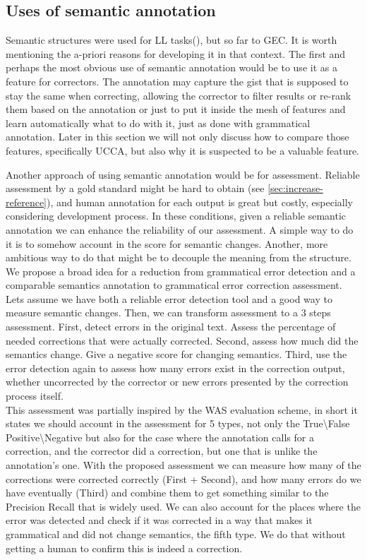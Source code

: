 \documentclass[english]{article}
\begin{document}
\subsection{Uses of semantic annotation}

Semantic structures were used for LL tasks(\cite{king2013shallow}), but so far to GEC. It is worth mentioning the a-priori reasons for developing
it in that context. The first and perhaps the most obvious use of semantic annotation
would be to use it as a feature for correctors. The annotation may
capture the gist that is supposed to stay the same when correcting,
allowing the corrector to filter results or re-rank them based on
the annotation or just to put it inside the mesh of features and learn
automatically what to do with it, just as done with grammatical annotation.
Later in this section we will not only discuss how to compare those
features, specifically UCCA, but also why it is suspected to be a
valuable feature.

Another approach of using semantic annotation would be for assessment.
Reliable assessment by a gold standard might be hard to obtain (see
\ref{sec:increase-reference}), and human annotation for each output is great\cite{madnani2011they}
but costly, especially considering development process. In these conditions,
given a reliable semantic annotation we can enhance the reliability
of our assessment. A simple way to do it is to somehow account in the score for semantic changes. Another, more ambitious way to do that might be to decouple the meaning
from the structure. We propose a broad idea for a reduction from grammatical
error detection and a comparable semantics annotation to grammatical
error correction assessment. Lets assume we have both a reliable error
detection tool and a good way to measure semantic changes. Then, we
can transform assessment to a 3 steps assessment. First, detect errors
in the original text. Assess the percentage of needed corrections
that were actually corrected. Second, assess how much did the semantics change.
 Give a negative score for changing semantics. Third, use
the error detection again to assess how many errors exist in the correction
output, whether uncorrected by the corrector or new errors presented
by the correction process itself. \\

This assessment was partially inspired by the WAS evaluation scheme\cite{chodorow2012problems},
in short it states we should account in the assessment for 5 types,
not only the True\textbackslash{}False Positive\textbackslash{}Negative
but also for the case where the annotation calls for a correction,
and the corrector did a correction, but one that is unlike the annotation's
one. With the proposed assessment we can measure how many of the corrections
were corrected correctly (First + Second), and how many errors do
we have eventually (Third) and combine them to get something similar
to the Precision Recall that is widely used. We can also account for
the places where the error was detected and check if it was corrected
in a way that makes it grammatical and did not change semantics, the
fifth type. We do that without getting a human to confirm this is
indeed a correction.
\end{document}
